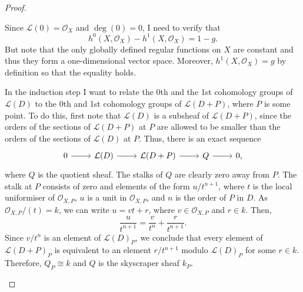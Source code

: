 \begin{proof}
  \begin{description}[style=nextline]
    \item[base case$\big)$]
          Since $\mathcal{L}(0)=\mathscr{O}_{X}$ and $\deg(0)=0$,
          I need to verify that
          \[h^{0}(X, \mathscr{O}_{X})-h^{1}(X, \mathscr{O}_{X})=1-g.\]
          But note that the only globally defined regular functions
          on $X$ are constant and thus they form a one-dimensional vector
          space. Moreover, $h^{1}(X, \mathscr{O}_{X})=g$ by definition
          so that the equality holds.
    \item[induction step$\big)$]
          In the induction step I want to relate the 0th and the 1st
          cohomology groups of $\mathcal{L}(D)$ to the 0th and
          1st cohomology groups of $\mathcal{L}(D+P)$, where
          $P$ is some point. To do this, first note that
          $\mathcal{L}(D)$ is a subsheaf of $\mathcal{L}(D+P)$, since
          the orders of the sections of $\mathcal{L}(D+P)$ at $P$ are
          allowed to be smaller than the orders of the sections of
          $\mathcal{L}(D)$ at $P$. Thus, there is an exact sequence
          \[
          \begin{tikzcd}
            0\arrow{r} & \mathcal{L}(D)\arrow{r} & \mathcal{L}(D+P)\arrow{r}
            & Q\arrow{r} & 0,
          \end{tikzcd}
          \]
          where $Q$ is the quotient sheaf. The stalks of $Q$ are clearly
          zero away from $P$. The stalk at $P$ consists of zero and
          elements of the form $u/t^{n+1}$, where $t$ is the local
          uniformiser of $\mathscr{O}_{X,P}$, $u$ is a unit in
          $\mathcal{O}_{X,P}$, and $n$ is the order of $P$ in $D$.
          As $\mathcal{O}_{X,P}/(t)=k$, we can write $u=vt+r$,
          where $v\in\mathcal{O}_{X,P}$ and $r\in k$.
          Then,
          \[\frac{u}{t^{n+1}}=\frac{v}{t^n}+\frac{r}{t^{n+1}}.\]
          Since $v/t^n$ is an element of $\mathcal{L}(D)_{P}$, we conclude
          that every element of $\mathcal{L}(D+P)_{P}$ is equivalent to
          an element $r/t^{n+1}$ modulo $\mathcal{L}(D)_{P}$ for some
          $r\in k$. Therefore, $Q_{P}\cong k$ and $Q$ is the skyscraper sheaf
          $k_{P}$.


\end{description}
\end{proof}
